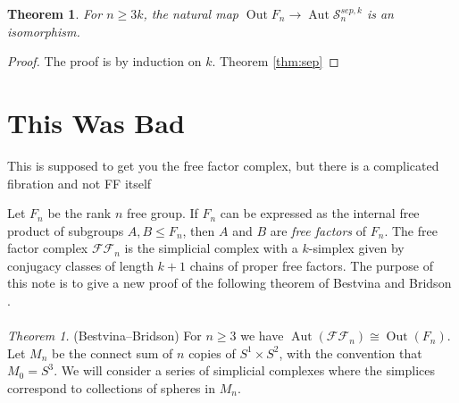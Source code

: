\documentclass[11pt]{article}
\newcommand{\Aut}[1]{\ensuremath{ \aaut \left (#1 \right ) }}
\newcommand{\outn}{{\ensuremath{ \oout(F_n)}} }
\newcommand{\ffn}{{\ensuremath{ \mathcal {FF}_n }}}
\DeclareMathOperator{\oout}{Out}
\DeclareMathOperator{\aaut}{Aut}
\newtheorem{theorem}{Theorem}
\theoremstyle{remark}
\theoremstyle{definition}
\begin{document}
\begin{theorem}
  For  $n\geq 3k$,
  the natural map
   $\oout F_n \to \aaut  \mathcal S^{sep,k}_n$
   is an isomorphism.
\end{theorem}

\begin{proof}
The proof is by induction on $k$.
Theorem \ref{thm:sep}
\end{proof}


\section{This Was Bad}
This is supposed to get you the free factor complex, but
there is a complicated fibration and not FF itself


Let $F_n$ be the rank $n$ free group.
If $F_n$ can be expressed as the internal free product of subgroups $A,B \leqslant F_n$, then $A$ and $B$ are \emph{free factors} of $F_n$.
The free factor complex $\mathcal {FF}_n$ is the simplicial complex with a $k$-simplex given by conjugacy classes of length $k+1$ chains of proper free factors.
The purpose of this note is to give a new proof of the following theorem of Bestvina and Bridson \cite{bridson}.\\
\\
\noindent \emph{Theorem 1.} (Bestvina--Bridson) For $n \geq 3$ we have $\Aut{\ffn} \cong \outn$.\\

Let $M_{n}$ be the connect sum of $n$ copies of  $S^1 \times S^2$, with the convention that $M_0 =S^3$.
We will consider a series of simplicial complexes where the simplices correspond to collections of spheres in
$M_n$.
\end{document}
